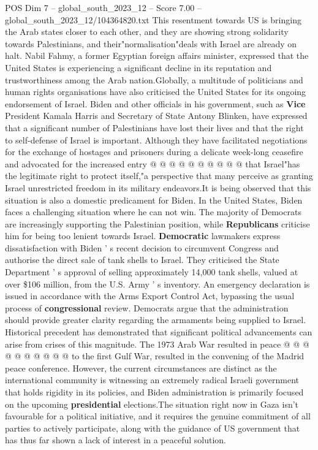 \begin{textsample}{POS Dim 7 – global\_south\_2023\_12 – Score 7.00 – global\_south\_2023\_12/104364820.txt}
This resentment towards US is bringing the Arab states closer to each other, and they are showing strong solidarity towards Palestinians, and their"normalisation"deals with Israel are already on halt.
Nabil Fahmy, a former Egyptian foreign affairs minister, expressed that the United States is experiencing a significant decline in its reputation and trustworthiness among the Arab nation.Globally, a multitude of politicians and human rights organisations have also criticised the United States for its ongoing endorsement of Israel.
Biden and other officials in his government, such as \textbf{Vice} President Kamala Harris and Secretary of State Antony Blinken, have expressed that a significant number of Palestinians have lost their lives and that the right to self-defense of Israel is important.
Although they have facilitated negotiations for the exchange of hostages and prisoners during a delicate week-long ceasefire and advocated for the increased entry @ @ @ @ @ @ @ @ @ @ that Israel"has the legitimate right to protect itself,"a perspective that many perceive as granting Israel unrestricted freedom in its military endeavors.It is being observed that this situation is also a domestic predicament for Biden.
In the United States, Biden faces a challenging situation where he can not win.
The majority of Democrats are increasingly supporting the Palestinian position, while \textbf{Republicans} criticise him for being too lenient towards Israel. \textbf{Democratic} lawmakers express dissatisfaction with Biden ' s recent decision to circumvent Congress and authorise the direct sale of tank shells to Israel.
They criticised the State Department ' s approval of selling approximately 14,000 tank shells, valued at over \$106 million, from the U.S.
Army ' s inventory.
An emergency declaration is issued in accordance with the Arms Export Control Act, bypassing the usual process of \textbf{congressional} review.
Democrats argue that the administration should provide greater clarity regarding the armaments being supplied to Israel.
Historical precedent has demonstrated that significant political advancements can arise from crises of this magnitude.
The 1973 Arab War resulted in peace @ @ @ @ @ @ @ @ @ @ to the first Gulf War, resulted in the convening of the Madrid peace conference.
However, the current circumstances are distinct as the international community is witnessing an extremely radical Israeli government that holds rigidity in its policies, and Biden administration is primarily focused on the upcoming \textbf{presidential} elections.The situation right now in Gaza isn't favourable for a political initiative, and it requires the genuine commitment of all parties to actively participate, along with the guidance of US government that has thus far shown a lack of interest in a peaceful solution.

\end{textsample}

